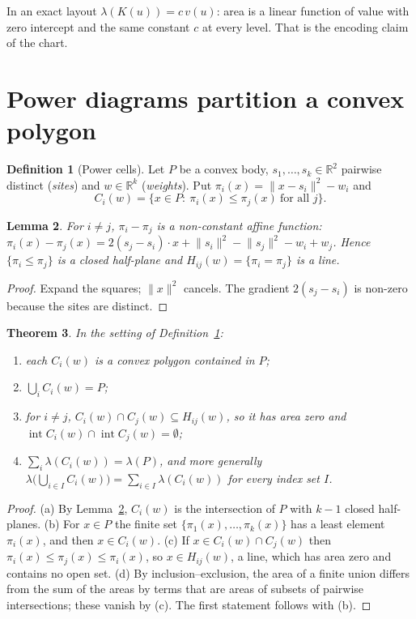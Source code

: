\documentclass[11pt,a4paper]{article}
\theoremstyle{plain}
\newtheorem{theorem}{Theorem}
\newtheorem{lemma}[theorem]{Lemma}
\theoremstyle{definition}
\newtheorem{definition}[theorem]{Definition}
\theoremstyle{remark}
\newcommand{\R}{\mathbb{R}}
\newcommand{\area}{\lambda}
\newcommand{\norm}[1]{\lVert #1\rVert}
\newcommand{\interior}{\operatorname{int}}
\begin{document}
In an exact layout $\area(K(u))=c\,v(u)$: area is a linear function of value
with zero intercept and the same constant $c$ at every level. That is the
encoding claim of the chart.

\section{Power diagrams partition a convex polygon}

\begin{definition}[Power cells]\label{def:power}
Let $P$ be a convex body, $s_1,\dots,s_k\in\R^2$ pairwise distinct
(\emph{sites}) and $w\in\R^k$ (\emph{weights}). Put
$\pi_i(x)=\norm{x-s_i}^2-w_i$ and
\[
  C_i(w)=\{x\in P:\ \pi_i(x)\le\pi_j(x)\ \text{for all } j\}.
\]
\end{definition}

\begin{lemma}\label{lem:affine}
For $i\ne j$, $\pi_i-\pi_j$ is a non-constant affine function:
$\pi_i(x)-\pi_j(x)=2(s_j-s_i)\cdot x+\norm{s_i}^2-\norm{s_j}^2-w_i+w_j$.
Hence $\{\pi_i\le\pi_j\}$ is a closed half-plane and
$H_{ij}(w)=\{\pi_i=\pi_j\}$ is a line.
\end{lemma}
\begin{proof}
Expand the squares; $\norm{x}^2$ cancels. The gradient $2(s_j-s_i)$ is non-zero
because the sites are distinct.
\end{proof}

\begin{theorem}\label{thm:power}
In the setting of Definition~\ref{def:power}:
\begin{enumerate}[label=(\alph*)]
\item each $C_i(w)$ is a convex polygon contained in $P$;
\item $\bigcup_i C_i(w)=P$;
\item for $i\ne j$, $C_i(w)\cap C_j(w)\subseteq H_{ij}(w)$, so it has area
      zero and $\interior C_i(w)\cap\interior C_j(w)=\emptyset$;
\item $\sum_i\area(C_i(w))=\area(P)$, and more generally
      $\area\bigl(\bigcup_{i\in I}C_i(w)\bigr)=\sum_{i\in I}\area(C_i(w))$ for
      every index set $I$.
\end{enumerate}
\end{theorem}
\begin{proof}
(a) By Lemma~\ref{lem:affine}, $C_i(w)$ is the intersection of $P$ with $k-1$
closed half-planes.
(b) For $x\in P$ the finite set $\{\pi_1(x),\dots,\pi_k(x)\}$ has a least
element $\pi_i(x)$, and then $x\in C_i(w)$.
(c) If $x\in C_i(w)\cap C_j(w)$ then $\pi_i(x)\le\pi_j(x)\le\pi_i(x)$, so
$x\in H_{ij}(w)$, a line, which has area zero and contains no open set.
(d) By inclusion--exclusion, the area of a finite union differs from the sum of
the areas by terms that are areas of subsets of pairwise intersections; these
vanish by (c). The first statement follows with (b).
\end{proof}
\end{document}
